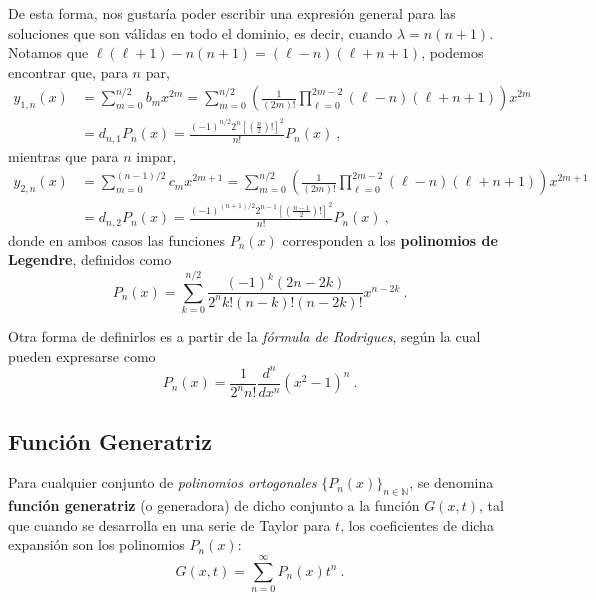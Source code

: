 De esta forma, nos gustaría poder escribir una expresión general para las soluciones que son válidas en todo el dominio, es decir, cuando $\lambda = n(n+1)$. Notamos que $\ell(\ell+1)-n(n+1) = (\ell - n)(\ell + n + 1)$, podemos encontrar que, para $n$ par,
\begin{align} \label{eq:y1n_legendre}
    y_{1,n}(x) & = \sum_{m=0}^{n/2} b_m x^{2m} = \sum_{m=0}^{n/2} \left(\frac{1}{(2m)!} \prod_{\ell=0}^{2m-2} (\ell-n)(\ell+n+1) \right) x^{2m} \\
    & = d_{n,1} P_n(x) = \frac{(-1)^{n/2} 2^n \left[ \left(\frac{n}{2}\right)! \right]^2}{n!}P_n(x) \ , \label{eq:y2n_legendre}
\end{align}
mientras que para $n$ impar,
\begin{align}
    y_{2,n}(x) & = \sum_{m=0}^{(n-1)/2} c_m x^{2m+1} = \sum_{m=0}^{n/2} \left(\frac{1}{(2m)!} \prod_{\ell=0}^{2m-2} (\ell-n)(\ell+n+1) \right) x^{2m+1} \\
    & = d_{n,2} P_n(x) = \frac{(-1)^{(n+1)/2} 2^{n-1} \left[ \left(\frac{n-1}{2}\right)! \right]^2}{n!}P_n(x) \ ,
\end{align}
donde en ambos casos las funciones $P_n(x)$ corresponden a los \textbf{polinomios de Legendre}, definidos como
\begin{equation}
    P_n(x) = \sum_{k=0}^{n/2} \frac{(-1)^k (2n-2k)}{2^n k! (n-k)! (n-2k)!}x^{n-2k} \ .
\end{equation}

Otra forma de definirlos es a partir de la \emph{fórmula de Rodrigues}, según la cual pueden expresarse como
\begin{equation}
    P_n(x) = \frac{1}{2^n n!} \frac{d^n}{dx^n} (x^2-1)^n \ .
\end{equation}

\subsection{Función Generatriz}

\begin{defi}
    Para cualquier conjunto de \emph{polinomios ortogonales} $\{P_n(x)\}_{n\in \mathbb{N}}$, se denomina \textbf{función generatriz} (o generadora) de dicho conjunto a la función $G(x,t)$, tal que cuando se desarrolla en una serie de Taylor para $t$, los coeficientes de dicha expansión son los polinomios $P_n(x)$:
\begin{equation}
    G(x,t) = \sum_{n=0}^{\infty} P_n(x)t^n \ .
\end{equation}
\end{defi}

